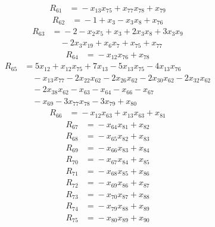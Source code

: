 \begin{align*}
R_{61}&={}-x_{13}x_{75} +x_{77}x_{78} +x_{79}
\end{align*}
\begin{align*}
R_{62}&={}-1 +x_{3} -x_{3}x_{8} +x_{76}
\end{align*}
\begin{align*}
R_{63}&={}-2 -x_{2}x_{5} +x_{3} +2x_{3}x_{8} +3x_{3}x_{9}\\
&\quad{}-2x_{3}x_{19} +x_{6}x_{7} +x_{75} +x_{77}
\end{align*}
\begin{align*}
R_{64}&={}-x_{12}x_{76} +x_{78}
\end{align*}
\begin{align*}
R_{65}&={}5x_{12} +x_{12}x_{75} +7x_{13} -5x_{13}x_{75} -4x_{13}x_{76}\\
&\quad{}-x_{13}x_{77} -2x_{22}x_{62} -2x_{26}x_{62} -2x_{30}x_{62} -2x_{32}x_{62}\\
&\quad{}-2x_{38}x_{62} -x_{63} -x_{64} -x_{66} -x_{67}\\
&\quad{}-x_{69} -3x_{77}x_{78} -3x_{79} +x_{80}
\end{align*}
\begin{align*}
R_{66}&={}-x_{12}x_{63} +x_{13}x_{63} +x_{81}
\end{align*}
\begin{align*}
R_{67}&={}-x_{64}x_{81} +x_{82}
\end{align*}
\begin{align*}
R_{68}&={}-x_{65}x_{82} +x_{83}
\end{align*}
\begin{align*}
R_{69}&={}-x_{66}x_{83} +x_{84}
\end{align*}
\begin{align*}
R_{70}&={}-x_{67}x_{84} +x_{85}
\end{align*}
\begin{align*}
R_{71}&={}-x_{68}x_{85} +x_{86}
\end{align*}
\begin{align*}
R_{72}&={}-x_{69}x_{86} +x_{87}
\end{align*}
\begin{align*}
R_{73}&={}-x_{70}x_{87} +x_{88}
\end{align*}
\begin{align*}
R_{74}&={}-x_{79}x_{88} +x_{89}
\end{align*}
\begin{align*}
R_{75}&={}-x_{80}x_{89} +x_{90}
\end{align*}
